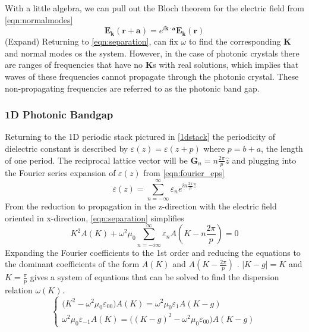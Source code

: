 With a little algebra, we can pull out the Bloch theorem for the electric field from \eqref{eqn:normalmodes}
\begin{equation}
	\boldsymbol{E}_{\boldsymbol{k}}(\boldsymbol{r}+\boldsymbol{a}) = e^{i\boldsymbol{k}\cdot \boldsymbol{a}}\boldsymbol{E}_{\boldsymbol{k}}(\boldsymbol{r})
\end{equation}
(Expand)  Returning to \eqref{eqn:separation}, can fix $\omega$ to find the corresponding $\boldsymbol{K}$ and normal modes os the system. However, in the case of photonic crystals there are ranges of frequencies that  have no $\boldsymbol{K}$s with real solutions, which implies that waves of these frequencies cannot propagate through the photonic crystal. These non-propagating frequencies are referred to as the photonic band gap.

\subsubsection{1D Photonic Bandgap}
Returning to the 1D periodic stack pictured in \ref{1dstack} the periodicity of dielectric constant is described by $\varepsilon(z) = \varepsilon(z+p)$ where $p = b+a$, the length of one period. The reciprocal lattice vector will be $\boldsymbol{G}_n = n\frac{2\pi}{p}\hat{z}$ and plugging into the Fourier series expansion of $\varepsilon(z)$  from \eqref{eqn:fourier_eps} 
\begin{equation}
	\varepsilon(z)  =\sum_{n=-\infty}^\infty\varepsilon_ne^{in\frac{2\pi}{p}\hat{z}}  
\end{equation}
From the reduction to propagation in the z-direction with the electric field oriented in x-direction, \eqref{eqn:separation} simplifies
\begin{equation}
K^2A(K) + \omega^2\mu_0\sum_{n=-i\infty}^\infty\varepsilon_nA(K-n\frac{2\pi}{p}) = 0
\end{equation}
Expanding the Fourier coefficients to the 1st order and reducing the equations to the dominant coefficients of the form $A(K)$ and $A(K-\frac{2\pi}{p})$ . $|K - g| = K$ and $K = \frac{\pi}{p}$ gives a system of equations that can be solved to find the dispersion relation $\omega(K)$.
\begin{equation}
	\begin{cases}
		\big(K^2-\omega^2\mu_0\varepsilon_{00}\big)A(K) = \omega^2\mu_0\varepsilon_1A(K - g)\\
		\omega^2\mu_0\varepsilon_{-1}A(K) = \big((K-g)^2-\omega^2\mu_0\varepsilon_{00}\big)A(K-g) 
	\end{cases}
\end{equation}
